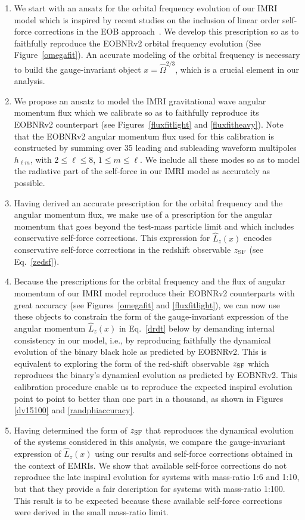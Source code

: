  \begin{enumerate}
 \item We start with an ansatz for the orbital frequency evolution of our IMRI model which is inspired by recent studies on the inclusion of linear order self-force corrections in the EOB approach~\cite{barus}. We develop this prescription so as to faithfully reproduce the EOBNRv2 orbital frequency evolution (See Figure~\ref{omegafit}).  An accurate modeling of the orbital frequency is necessary to build the gauge-invariant object \(x=\hat\Omega^{2/3}\), which is a crucial element in our analysis. 
 \item We propose an ansatz to model the IMRI gravitational wave angular momentum flux which we calibrate so as to faithfully reproduce its EOBNRv2 counterpart (see Figures~\ref{fluxfitlight} and \ref{fluxfitheavy}). Note that the EOBNRv2 angular momentum flux used for this calibration  is constructed by summing over  35 leading and subleading waveform multipoles \(h_{\ell m}\), with  \(2\leq \ell \leq 8\), \(1\leq m\leq \ell\).  We include all these modes so as to model the radiative part of the self-force in our IMRI model as accurately as possible.
 \item Having derived an accurate prescription for the orbital frequency and the angular momentum flux, we make use of a prescription for the angular momentum that goes beyond the test-mass particle limit and which includes conservative self-force corrections. This expression for \(\hat{L}_z (x)\) encodes conservative self-force corrections in the redshift observable \(z_{\rm SF}\) (see Eq.~\eqref{zedsf}). 
 \item Because the prescriptions for the orbital frequency and the flux of angular momentum of our IMRI model reproduce their EOBNRv2 counterparts with great accuracy (see Figures~\ref{omegafit} and \ref{fluxfitlight}), we can now use these objects to constrain the form of the gauge-invariant expression of the angular momentum \(\hat{L}_z (x)\) in Eq.~\eqref{drdt} below by demanding internal consistency in our model, i.e., by reproducing faithfully the dynamical evolution of the binary black hole as predicted by EOBNRv2. This is equivalent to exploring the form of the red-shift observable \(z_{\rm SF}\) which reproduces the binary's dynamical evolution as predicted by EOBNRv2. This calibration procedure enable us to reproduce the expected inspiral evolution point to point to better than one part in a thousand, as shown in Figures \ref{dv15100} and \ref{randphiaccuracy}.
 \item Having determined the form of \(z_{\rm SF}\) that reproduces the dynamical evolution of the systems considered in this analysis, we compare the gauge-invariant expression of \(\hat{L}_z (x)\)  using our results and self-force corrections obtained in the context of EMRIs. We show that available self-force corrections do not reproduce the late inspiral evolution for systems with mass-ratio 1:6 and 1:10, but that they provide a fair description for systems with mass-ratio 1:100. This result is to be expected because these available self-force corrections were derived in the small mass-ratio limit.
 \end{enumerate}
 
